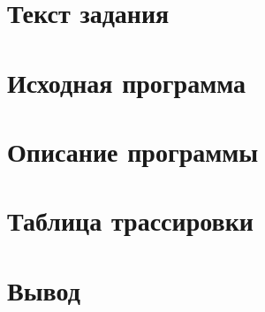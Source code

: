 \documentclass[a4paper, 11pt]{article}
\begin{document}


\tableofcontents
\vspace{2em}
\pagebreak{}

\section{Текст задания}


\section{Исходная программа}


\section{Описание программы}




\section{Таблица трассировки}


\section{Вывод}

\end{document}
